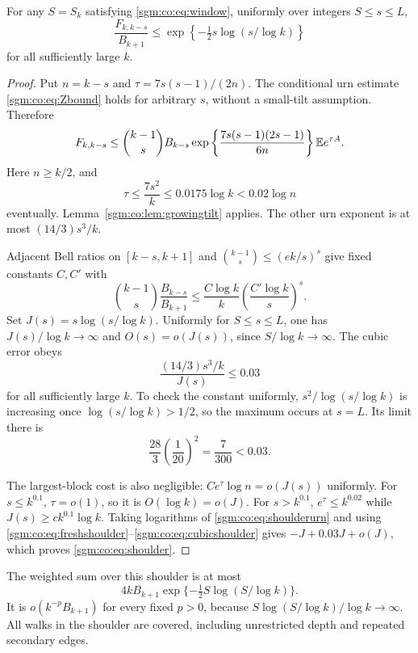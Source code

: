 \documentclass[11pt,letterpaper]{article}
\theoremstyle{remark}\newtheorem{remark}[theorem]{Remark}
\theoremstyle{definition}\newtheorem{definition}[theorem]{Definition}
\begin{document}
\begin{proposition}\label{sgm:co:prop:shoulder}
For any $S=S_k$ satisfying \eqref{sgm:co:eq:window}, uniformly over integers $S\le s\le L$,
\begin{equation}\label{sgm:co:eq:shoulder}
 \frac{F_{k,k-s}}{B_{k+1}}
 \le\exp\left\{-\tfrac12s\log(s/\log k)\right\}
\end{equation}
for all sufficiently large $k$.
\end{proposition}
\begin{proof}
Put $n=k-s$ and $\tau=7s(s-1)/(2n)$. The conditional urn estimate \eqref{sgm:co:eq:Zbound} holds for arbitrary $s$, without a small-tilt assumption. Therefore
\begin{equation}\label{sgm:co:eq:shoulderurn}
 F_{k,k-s}\le\binom{k-1}s B_{k-s}
 \exp\left\{\frac{7s(s-1)(2s-1)}{6n}\right\}\mathbb E e^{\tau A}.
\end{equation}
Here $n\ge k/2$, and
\[
 \tau\le\frac{7s^2}k\le0.0175\log k<0.02\log n
\]
eventually. Lemma~\ref{sgm:co:lem:growingtilt} applies. The other urn exponent is at most $(14/3)s^3/k$.

Adjacent Bell ratios on $[k-s,k+1]$ and $\binom{k-1}s\le(ek/s)^s$ give fixed constants $C,C'$ with
\begin{equation}\label{sgm:co:eq:freshshoulder}
 \binom{k-1}s\frac{B_{k-s}}{B_{k+1}}
 \le\frac{C\log k}k\left(\frac{C'\log k}s\right)^s.
\end{equation}
Set $J(s)=s\log(s/\log k)$. Uniformly for $S\le s\le L$, one has $J(s)/\log k\to\infty$ and $O(s)=o(J(s))$, since $S/\log k\to\infty$.
The cubic error obeys
\begin{equation}\label{sgm:co:eq:cubicshoulder}
 \frac{(14/3)s^3/k}{J(s)}\le0.03
\end{equation}
for all sufficiently large $k$. To check the constant uniformly, $s^2/\log(s/\log k)$ is increasing once $\log(s/\log k)>1/2$, so the maximum occurs at $s=L$. Its limit there is
\[
 \frac{28}{3}\left(\frac1{20}\right)^2=\frac7{300}<0.03.
\]

The largest-block cost is also negligible: $Ce^\tau\log n=o(J(s))$ uniformly. For $s\le k^{0.1}$, $\tau=o(1)$, so it is $O(\log k)=o(J)$. For $s>k^{0.1}$, $e^\tau\le k^{0.02}$ while $J(s)\ge c k^{0.1}\log k$. Taking logarithms of \eqref{sgm:co:eq:shoulderurn} and using \eqref{sgm:co:eq:freshshoulder}--\eqref{sgm:co:eq:cubicshoulder} gives $-J+0.03J+o(J)$, which proves \eqref{sgm:co:eq:shoulder}.
\end{proof}
The weighted sum over this shoulder is at most
\[
 4kB_{k+1}\exp\{-\tfrac12S\log(S/\log k)\}.
\]
It is $o(k^{-p}B_{k+1})$ for every fixed $p>0$, because
$S\log(S/\log k)/\log k\to\infty$. All walks in the shoulder are covered, including unrestricted depth and repeated secondary edges.
\end{document}

